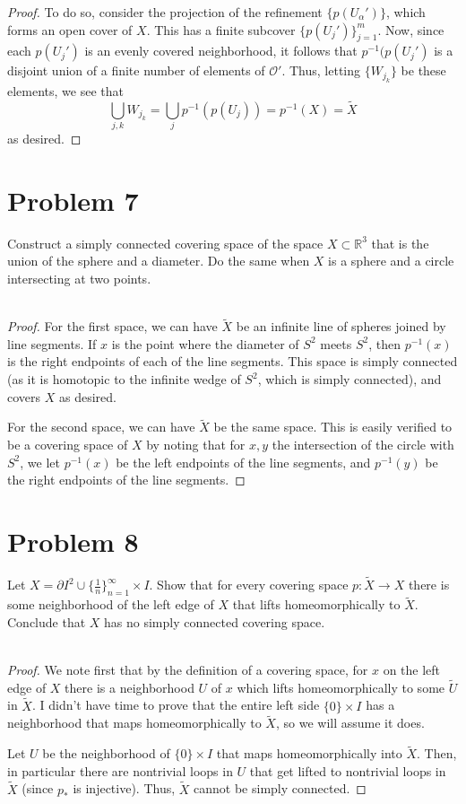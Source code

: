 \documentclass[fontsize=11pt]{scrartcl} %
\numberwithin{equation}{section} %
\numberwithin{figure}{section} %
\numberwithin{table}{section} %
\newcommand{\R}{\mathbb{R}}
\begin{document}
\begin{proof}
    To do so, consider the projection of the refinement $\{p(U_{\alpha}')\}$,
    which forms an open cover of $X$. This has a finite subcover
    $\{p(U_j')\}_{j=1}^m$. Now, since each $p(U_j')$ is an evenly covered
    neighborhood, it follows that $p^{-1}(p(U_j')$ is a disjoint union of a
    finite number of elements of $\mathscr{O}'$. Thus, letting $\{W_{j_k}\}$ be
    these elements, we see that
    \[
        \bigcup_{j,k}W_{j_k} = \bigcup_j p^{-1}(p(U_j)) = p^{-1}(X) =
        \tilde{X}
    \]
    as desired.
\end{proof}

\section*{Problem 7}
Construct a simply connected covering space of the space $X\subset \R^3$  that
is the union of the sphere and a diameter. Do the same when $X$ is a sphere and
a circle intersecting at two points.
\\
\\
\begin{proof}
    For the first space, we can have $\tilde{X}$ be an infinite line of spheres
    joined by line segments. If $x$ is the point where the diameter of $S^2$
    meets $S^2$, then $p^{-1}(x)$ is the right endpoints of each of the line
    segments. This space is simply connected (as it is homotopic
    to the infinite wedge of $S^2$, which is simply connected), and covers $X$
    as desired.

    For the second space, we can have $\tilde{X}$ be the same space. This is
    easily verified to be a covering space of $X$ by noting that for $x,y$ the
    intersection of the circle with $S^2$, we let $p^{-1}(x)$ be the left
    endpoints of the line segments, and $p^{-1}(y)$ be the right endpoints of
    the line segments.
\end{proof}

\section*{Problem 8}
Let $X = \partial I^2 \cup \{\frac{1}{n}\}_{n=1}^{\infty}\times I$. Show that
for every covering space $p:\tilde{X}\to X$ there is some neighborhood of the
left edge of $X$ that lifts homeomorphically to $\tilde{X}$. Conclude that $X$
has no simply connected covering space.
\\
\\
\begin{proof}
    We note first that by the definition of a covering space, for $x$ on the
    left edge of $X$ there is a neighborhood $U$ of $x$ which lifts
    homeomorphically to some $\tilde{U}$ in $\tilde{X}$. I didn't have time to
    prove that the entire left side $\{0\}\times I$  has a neighborhood that
    maps homeomorphically to $\tilde{X}$, so we will assume it does.

    Let $U$ be the neighborhood of $\{0\}\times I$ that maps homeomorphically
    into $\tilde{X}$. Then, in particular there are nontrivial loops in $U$ that
    get lifted to nontrivial loops in $\tilde{X}$ (since $p_*$ is injective).
    Thus, $\tilde{X}$ cannot be simply connected.
\end{proof}
\end{document}
